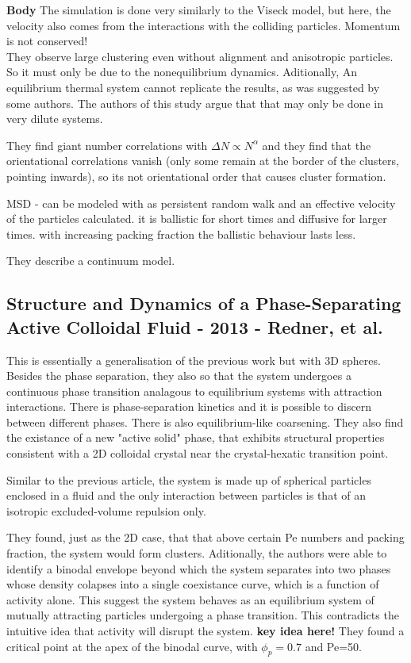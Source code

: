 \documentclass[a4paper]{article}
\begin{document}
\textbf{Body}
The simulation is done very similarly to the Viseck model, but here, the velocity also comes from the interactions with the colliding particles. Momentum is not conserved!\\

They observe large clustering even without alignment and anisotropic particles. So it must only be due to the nonequilibrium dynamics. Aditionally, An equilibrium thermal system cannot replicate the results, as was suggested by some authors. The authors of this study argue that that may only be done in very dilute systems.

They find giant number correlations with $\Delta N \propto N^\alpha$ and they find that the orientational correlations vanish (only some remain at the border of the clusters, pointing inwards), so its not orientational order that causes cluster formation.

MSD - can be modeled with as persistent random walk and an effective velocity of the particles calculated. it is ballistic for short times and diffusive for larger times. with increasing packing fraction the ballistic behaviour lasts less.

They describe a continuum model. 

\subsection{Structure and Dynamics of a Phase-Separating Active Colloidal Fluid - 2013 - Redner, et al.}

This is essentially a generalisation of the previous work but with 3D spheres. Besides the phase separation, they also so that the system undergoes a continuous phase transition analagous to equilibrium systems with attraction interactions. There is phase-separation kinetics and it is possible to discern between different phases. There is also equilibrium-like coarsening. They also find the existance of a new "active solid" phase, that exhibits structural properties consistent with a 2D colloidal crystal near the crystal-hexatic transition point.

Similar to the previous article, the system is made up of spherical particles enclosed in a fluid and the only interaction between particles is that of an isotropic excluded-volume repulsion only. 

They found, just as the 2D case, that that above certain Pe numbers and packing fraction, the system would form clusters. Aditionally, the authors were able to identify a binodal envelope beyond which the system separates into two phases whose density colapses into a single coexistance curve, which is a function of activity alone. This suggest the system behaves as an equilibrium system of mutually attracting particles undergoing a phase transition. This contradicts the intuitive idea that activity will disrupt the system. \textbf{key idea here!} They found a critical point at the apex of the binodal curve, with $\phi_p=0.7$ and Pe=50.
\end{document}

